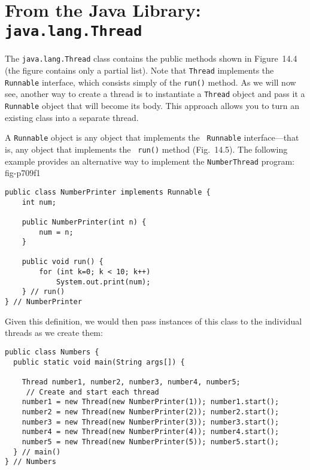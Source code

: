 
\section{From the Java Library: {\tt java.lang.Thread}}
\label{fromthe-java-library}
{The} {\tt java.lang.Thread} class contains the public methods shown
in Figure~14.4 (the figure contains only a partial list).  Note that
{\tt Thread} implements the {\tt Runnable} interface, which consists
simply of the {\tt run()} method.  As we will now see, another way to
create a thread is to instantiate a {\tt Thread} object and pass it a
{\tt Runnable} object that will become its body. This approach allows
you to turn an existing class into a separate thread.

A {\tt Runnable} object is any object that implements the {\tt
Runnable} interface---that is, any object that implements the {\tt
run()} method (Fig.~14.5).  The following example provides an
alternative way to implement the {\tt NumberThread} program:
{fig-p709f1}


\begin{jjjlisting}
\begin{lstlisting}
public class NumberPrinter implements Runnable {
    int num;

    public NumberPrinter(int n) {
        num = n;
    }

    public void run() {
        for (int k=0; k < 10; k++)
            System.out.print(num);
    } // run()
} // NumberPrinter
\end{lstlisting}
\end{jjjlisting}

\noindent Given this definition, we would then pass instances of this class to
the individual threads as we create them:

\begin{jjjlisting}[29pc]
\begin{lstlisting}
public class Numbers {
  public static void main(String args[]) {

    Thread number1, number2, number3, number4, number5;
     // Create and start each thread
    number1 = new Thread(new NumberPrinter(1)); number1.start(); 
    number2 = new Thread(new NumberPrinter(2)); number2.start();
    number3 = new Thread(new NumberPrinter(3)); number3.start();
    number4 = new Thread(new NumberPrinter(4)); number4.start();
    number5 = new Thread(new NumberPrinter(5)); number5.start();
  } // main()
} // Numbers
\end{lstlisting}
\end{jjjlisting}


